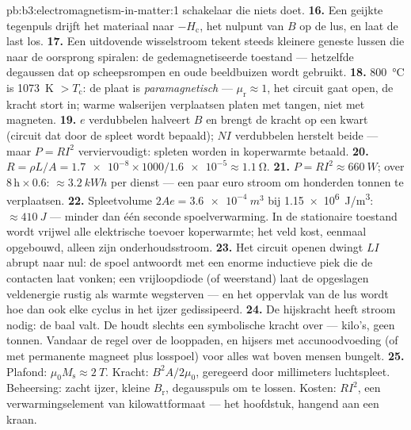 \begin{solution}{pb:b3:electromagnetism-in-matter:1}
schakelaar die niets doet.
\textbf{16.} Een geijkte tegenpuls drijft het materiaal naar
$-H_{\text{c}}$, het nulpunt van $B$ op de lus, en laat de
last los.
\textbf{17.} Een uitdovende wisselstroom tekent steeds kleinere geneste lussen
die naar de oorsprong spiralen: de gedemagnetiseerde toestand --- hetzelfde
degaussen dat op scheepsrompen en oude beeldbuizen wordt gebruikt.
\textbf{18.} \qty{800}{\celsius} is \qty{1073}{K} $> T_{\text{c}}$:
de plaat is \emph{paramagnetisch} --- $\mu_{\text{r}} \approx 1$,
het circuit gaat open, de kracht stort in; warme walserijen verplaatsen platen met
tangen, niet met magneten.
\textbf{19.} $e$ verdubbelen halveert $B$ en brengt de kracht op een kwart
(circuit dat door de spleet wordt bepaald); $NI$ verdubbelen herstelt beide --- maar
$P = RI^2$ verviervoudigt: spleten worden in koperwarmte betaald.
\textbf{20.} $R = \rho L/A = \num{1.7e-8}\times1000/
\num{1.6e-5} \approx \qty{1.1}{\ohm}$.
\textbf{21.} $P = RI^2 \approx \qty{660}{W}$; over
$8\,\text{h}\times0.6$: $\approx\qty{3.2}{kWh}$ per dienst ---
een paar euro stroom om honderden tonnen te verplaatsen.
\textbf{22.} Spleetvolume $2Ae = \qty{3.6e-4}{m^3}$ bij
\qty{1.15e6}{J/m^3}: $\approx\qty{410}{J}$ --- minder dan één
seconde spoelverwarming. In de stationaire toestand wordt vrijwel alle elektrische
toevoer koperwarmte; het veld kost, eenmaal opgebouwd, alleen zijn
onderhoudsstroom.
\textbf{23.} Het circuit openen dwingt $LI$ abrupt naar nul:
de spoel antwoordt met een enorme inductieve piek die de contacten
laat vonken; een vrijloopdiode (of weerstand) laat de opgeslagen veldenergie
rustig als warmte wegsterven --- en het oppervlak van de lus wordt hoe dan ook
elke cyclus in het ijzer gedissipeerd.
\textbf{24.} De hijskracht heeft stroom nodig: de baal valt.
De  houdt slechts een symbolische kracht over --- kilo's, geen tonnen.
Vandaar de regel over de looppaden, en hijsers met accunoodvoeding (of met
permanente magneet plus losspoel) voor alles wat boven mensen bungelt.
\textbf{25.} Plafond: $\mu_0M_{\text{s}} \approx \qty{2}{T}$.
Kracht: $B^2A/2\mu_0$, geregeerd door millimeters luchtspleet. Beheersing:
zacht ijzer, kleine $B_{\text{r}}$, degausspuls om te lossen. Kosten:
$RI^2$, een verwarmingselement van kilowattformaat --- het hoofdstuk, hangend aan een
kraan.
\end{solution}
